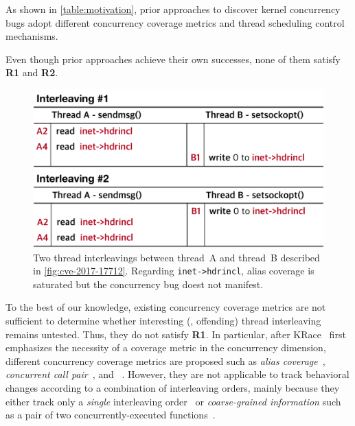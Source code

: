 As shown in \autoref{table:motivation}, prior approaches to discover
kernel concurrency bugs adopt different concurrency coverage metrics
and thread scheduling control mechanisms.

Even though prior approaches achieve their own successes, none of them
satisfy \textbf{R1} and \textbf{R2}.


%
\begin{figure}[t]
  \centering
  \includegraphics[width=0.95\linewidth]{fig/alias-coverage.pdf}
  \caption{Two thread interleavings between thread~A and thread~B
    described in \autoref{fig:cve-2017-17712}. Regarding
    \texttt{inet->hdrincl}, alias coverage is saturated but the
    concurrency bug doest not manifest.}
  \label{fig:alias-coverage}
\end{figure}
%
To the best of our knowledge, existing concurrency coverage metrics
are not sufficient to determine whether interesting (\ie, offending)
thread interleaving remains untested. Thus, they do not satisfy
\textbf{R1}.
%
In particular, after KRace~\cite{krace} first emphasizes the necessity
of a coverage metric in the concurrency dimension, different
concurrency coverage metrics are proposed such as \textit{alias
  coverage}~\cite{krace}, \textit{concurrent call
  pair}~\cite{conzzer}, and \textit{}~\cite{muzz}.
%
However, they are not applicable to track behavioral changes according
to a combination of interleaving orders, mainly because they either
track only a \textit{single} interleaving order~\cite{krace, muzz} or
\textit{coarse-grained information} such as a pair of two
concurrently-executed functions~\cite{conzzer}.

